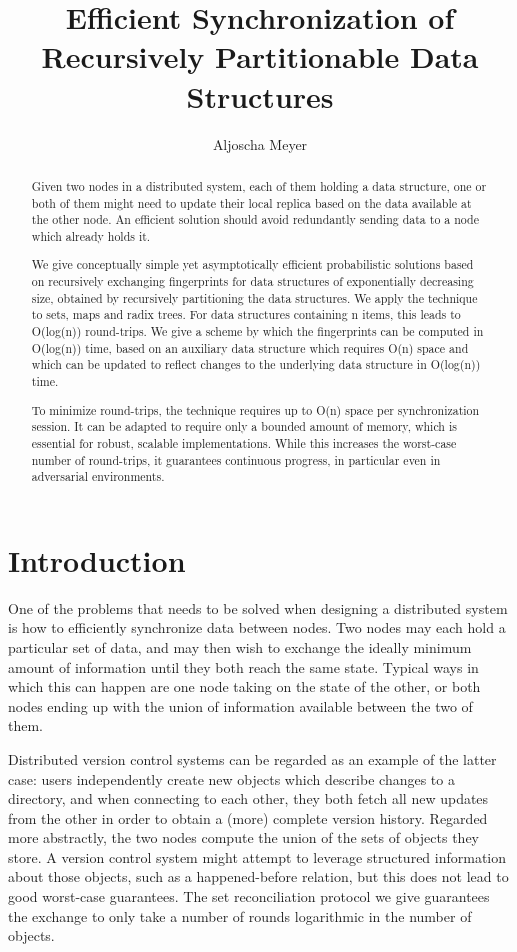 \documentclass{article}
\title{Efficient Synchronization of Recursively Partitionable Data
Structures}
\author{Aljoscha Meyer}
\begin{document}
\maketitle

\begin{abstract}
Given two nodes in a distributed system, each of them holding a data
structure, one or both of them might need to update their local replica
based on the data available at the other node. An efficient solution
should avoid redundantly sending data to a node which already holds it.

We give conceptually simple yet asymptotically efficient probabilistic
solutions based on recursively exchanging fingerprints for data
structures of exponentially decreasing size, obtained by recursively
partitioning the data structures. We apply the technique to sets, maps
and radix trees. For data structures containing n items, this leads to
O(log(n)) round-trips. We give a scheme by which the fingerprints can be
computed in O(log(n)) time, based on an auxiliary data structure which
requires O(n) space and which can be updated to reflect changes to the
underlying data structure in O(log(n)) time.

To minimize round-trips, the technique requires up to O(n) space per
synchronization session. It can be adapted to require only a bounded
amount of memory, which is essential for robust, scalable
implementations. While this increases the worst-case number of
round-trips, it guarantees continuous progress, in particular even in
adversarial environments.
\end{abstract}

\section{Introduction}\label{introduction}

One of the problems that needs to be solved when designing a distributed
system is how to efficiently synchronize data between nodes. Two nodes
may each hold a particular set of data, and may then wish to exchange
the ideally minimum amount of information until they both reach the same
state. Typical ways in which this can happen are one node taking on the
state of the other, or both nodes ending up with the union of
information available between the two of them.

Distributed version control systems can be regarded as an example of the
latter case: users independently create new objects which describe
changes to a directory, and when connecting to each other, they both
fetch all new updates from the other in order to obtain a (more)
complete version history. Regarded more abstractly, the two nodes
compute the union of the sets of objects they store. A version control
system might attempt to leverage structured information about those
objects, such as a happened-before relation, but this does not lead to
good worst-case guarantees. The set reconciliation protocol we give
guarantees the exchange to only take a number of rounds logarithmic in
the number of objects.
\end{document}
